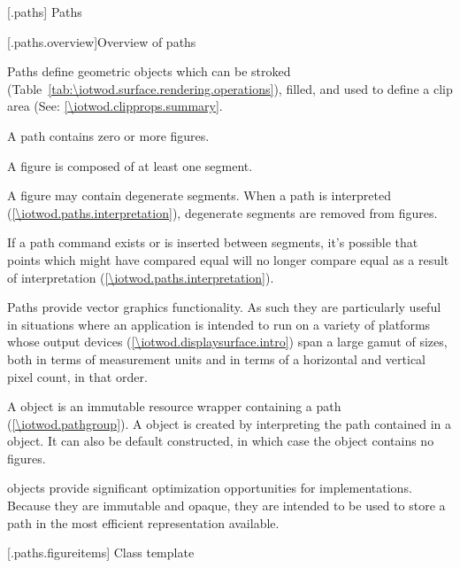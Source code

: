 
 [\iotwod.paths] {Paths}

 [\iotwod.paths.overview]{Overview of paths}

\pnum
Paths define geometric objects which can be stroked (Table~\ref{tab:\iotwod.surface.rendering.operations}), filled, and used to define a clip area (See: \ref{\iotwod.clipprops.summary}.

\pnum
A path contains zero or more figures.

\pnum
A figure is composed of at least one segment.

\pnum
A figure may contain degenerate segments. When a path is interpreted (\ref{\iotwod.paths.interpretation}), degenerate segments are removed from figures.
\begin{note}
If a path command exists or is inserted between segments, it's possible that points which might have compared equal will no longer compare equal as a result of interpretation (\ref{\iotwod.paths.interpretation}).
\end{note}

\pnum
Paths provide vector graphics functionality. As such they are particularly useful in situations where an application is intended to run on a variety of platforms whose output devices (\ref{\iotwod.displaysurface.intro}) span a large gamut of sizes, both in terms of measurement units and in terms of a horizontal and vertical pixel count, in that order.

\pnum
A  object is an immutable resource wrapper containing a path (\ref{\iotwod.pathgroup}). A  object is created by interpreting the path contained in a  object. It can also be default constructed, in which case the  object contains no figures.
\begin{note}
 objects provide significant optimization opportunities for implementations. Because they are immutable and opaque, they are intended to be used to store a path in the most efficient representation available.
\end{note}



 [\iotwod.paths.figureitems] {Class template }

\addtocounter{SectionDepthBase}{2}















\addtocounter{SectionDepthBase}{-2}

\addtocounter{SectionDepthBase}{1}


\addtocounter{SectionDepthBase}{-1}
